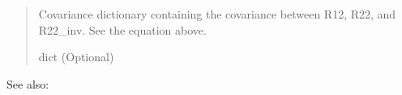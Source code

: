 \documentclass[letterpaper,10pt,english]{sphinxmanual}
\begin{document}
\begin{fulllineitems}
\begin{quote}
\begin{description}
\begin{itemize}
\end{itemize}

\sphinxAtStartPar
{} \textendash{} Covariance dictionary containing the covariance between R12, R22, and R22\_inv.
See the equation above.

\sphinxAtStartPar
dict (Optional)

\end{description}\end{quote}


\begin{sphinxseealso}{See also:}

\sphinxAtStartPar
{\hyperref[\detokenize{inpaint:inpaint.inpainting}]{}}


\end{sphinxseealso}


\end{fulllineitems}

\end{document}
